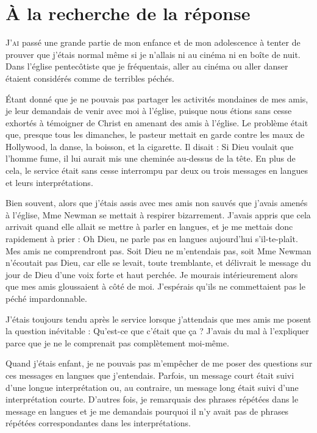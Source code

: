 \chapter{À la recherche de la réponse}

\lettrine[lines=3]{J}{'ai} passé une grande partie de mon enfance et de mon adolescence à tenter de prouver que j'étais normal même si je n'allais ni au cinéma ni en boîte de nuit. Dans l'église pentecôtiste que je fréquentais, aller au cinéma ou aller danser étaient considérés comme de terribles péchés.

Étant donné que je ne pouvais pas partager les activités mondaines de mes amis, je leur demandais de venir avec moi à l'église, puisque nous étions sans cesse exhortés à témoigner de Christ en amenant des amis à l'église. Le problème était que, presque tous les dimanches, le pasteur mettait en garde contre les maux de Hollywood, la danse, la boisson, et la cigarette. Il disait : \og Si Dieu voulait que l'homme fume, il lui aurait mis une cheminée au-dessus de la tête.\fg{} En plus de cela, le service était sans cesse interrompu par deux ou trois \og messages en langues \fg{} et leurs interprétations.

Bien souvent, alors que j'étais assis avec mes amis non sauvés que j'avais amenés à l'église, Mme Newman se mettait à respirer bizarrement. J'avais appris que cela arrivait quand elle allait se mettre à parler en langues, et je me mettais donc rapidement à prier : \og Oh Dieu, ne parle pas en langues aujourd'hui s'il-te-plaît. Mes amis ne comprendront pas. \fg{} Soit Dieu ne m'entendais pas, soit Mme Newman n'écoutait pas Dieu, car elle se levait, toute tremblante, et délivrait le message du jour de Dieu d'une voix forte et haut perchée. Je mourais intérieurement alors que mes amis gloussaient à côté de moi. J'espérais qu'ils ne commettaient pas le péché impardonnable.

J'étais toujours tendu après le service lorsque j'attendais que mes amis me posent la question inévitable : \og Qu'est-ce que c'était que ça ? \fg{} J'avais du mal à l'expliquer parce que je ne le comprenait pas complètement moi-même.

Quand j'étais enfant, je ne pouvais pas m'empêcher de me poser des questions sur ces \og messages en langues \fg{} que j'entendais. Parfois, un message court était suivi d'une longue interprétation ou, au contraire, un message long était suivi d'une interprétation courte. D'autres fois, je remarquais des phrases répétées dans le message en langues et je me demandais pourquoi il n'y avait pas de phrases répétées correspondantes dans les interprétations.


